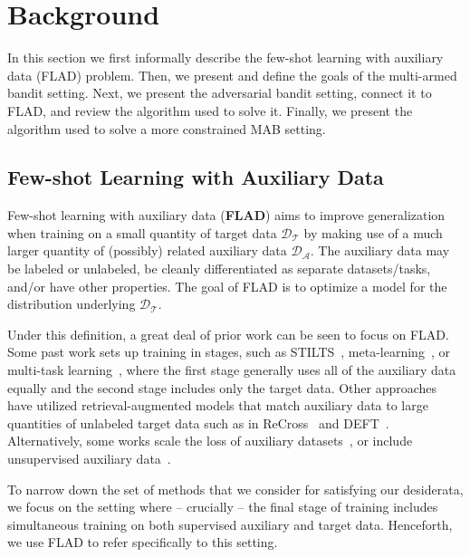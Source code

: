 \section{Background}
In this section we first informally describe the few-shot learning with auxiliary data (FLAD) problem. Then, we present and define the goals of the multi-armed bandit setting. Next, we present the adversarial bandit setting, connect it to FLAD, and review the \ex{} algorithm \citep{auer2002nonstochastic} used to solve it. Finally, we present the \ucb{} algorithm \citep{auer2002finite} used to solve a more constrained MAB setting.

\subsection{Few-shot Learning with Auxiliary Data}
Few-shot learning with auxiliary data (\textbf{FLAD}) aims to improve generalization when training on a small quantity of target data $\mathcal{D}_{\mathcal{T}}$ by making use of a much larger quantity of (possibly) related auxiliary data $\mathcal{D}_{\mathcal{A}}$. The auxiliary data may be labeled or unlabeled, be cleanly differentiated as separate datasets/tasks, and/or have other properties. The goal of FLAD is to optimize a model for the distribution underlying $\mathcal{D}_{\mathcal{T}}$.

Under this definition, a great deal of prior work can be seen to focus on FLAD.
Some past work sets up training in stages, such as STILTS~\citep{phang2018sentence}, meta-learning~\citep{bansal-etal-2020-self}, or multi-task learning~\citep{aghajanyan-etal-2021-muppet}, where the first stage generally uses all of the auxiliary data equally and the second stage includes only the target data. Other approaches have utilized retrieval-augmented models that match auxiliary data to large quantities of unlabeled target data such as in ReCross~\citep{Lin2022UnsupervisedCG} and DEFT~\citep{Ivison2022DEFT}. Alternatively, some works scale the loss of auxiliary datasets~\citet{Verboven2022}, or include unsupervised auxiliary data~\citet{deryAANG2022}.

To narrow down the set of methods that we consider for satisfying our desiderata, we focus on the setting where -- crucially -- the final stage of training includes simultaneous training on both supervised auxiliary and target data. Henceforth, we use FLAD to refer specifically to this setting.


